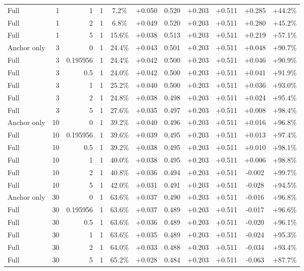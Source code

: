 \begin{table}[htbp]
\begin{tabular}{lrrrccccccc}
Full & 1 & 1 & 1 & 7.2\% & +0.050 & 0.520 & +0.203 & +0.511 & +0.285 & +44.2\% \\
Full & 1 & 2 & 1 & 6.8\% & +0.049 & 0.520 & +0.203 & +0.511 & +0.280 & +45.2\% \\
Full & 1 & 5 & 1 & 15.6\% & +0.038 & 0.513 & +0.203 & +0.511 & +0.219 & +57.1\% \\
Anchor only & 3 & 0 & 1 & 24.4\% & +0.043 & 0.501 & +0.203 & +0.511 & +0.048 & +90.7\% \\
Full & 3 & 0.195956 & 1 & 24.4\% & +0.042 & 0.500 & +0.203 & +0.511 & +0.046 & +90.9\% \\
Full & 3 & 0.5 & 1 & 24.0\% & +0.042 & 0.500 & +0.203 & +0.511 & +0.041 & +91.9\% \\
Full & 3 & 1 & 1 & 25.2\% & +0.040 & 0.500 & +0.203 & +0.511 & +0.036 & +93.0\% \\
Full & 3 & 2 & 1 & 24.8\% & +0.038 & 0.498 & +0.203 & +0.511 & +0.024 & +95.4\% \\
Full & 3 & 5 & 1 & 27.6\% & +0.035 & 0.497 & +0.203 & +0.511 & +0.008 & +98.4\% \\
Anchor only & 10 & 0 & 1 & 39.2\% & +0.040 & 0.496 & +0.203 & +0.511 & +0.016 & +96.8\% \\
Full & 10 & 0.195956 & 1 & 39.6\% & +0.039 & 0.495 & +0.203 & +0.511 & +0.013 & +97.4\% \\
Full & 10 & 0.5 & 1 & 39.2\% & +0.038 & 0.495 & +0.203 & +0.511 & +0.010 & +98.1\% \\
Full & 10 & 1 & 1 & 40.0\% & +0.038 & 0.495 & +0.203 & +0.511 & +0.006 & +98.8\% \\
Full & 10 & 2 & 1 & 40.8\% & +0.036 & 0.494 & +0.203 & +0.511 & -0.002 & +99.7\% \\
Full & 10 & 5 & 1 & 42.0\% & +0.031 & 0.491 & +0.203 & +0.511 & -0.028 & +94.5\% \\
Anchor only & 30 & 0 & 1 & 63.6\% & +0.037 & 0.490 & +0.203 & +0.511 & -0.016 & +96.8\% \\
Full & 30 & 0.195956 & 1 & 63.6\% & +0.037 & 0.489 & +0.203 & +0.511 & -0.017 & +96.6\% \\
Full & 30 & 0.5 & 1 & 63.6\% & +0.036 & 0.489 & +0.203 & +0.511 & -0.020 & +96.1\% \\
Full & 30 & 1 & 1 & 63.6\% & +0.035 & 0.489 & +0.203 & +0.511 & -0.024 & +95.3\% \\
Full & 30 & 2 & 1 & 64.0\% & +0.033 & 0.488 & +0.203 & +0.511 & -0.034 & +93.4\% \\
Full & 30 & 5 & 1 & 65.2\% & +0.028 & 0.484 & +0.203 & +0.511 & -0.063 & +87.7\% \\

\end{tabular}
\end{table}
